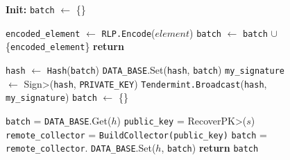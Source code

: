 \begin{figure}[t!]
  \begin{adjustbox}{minipage=[t]{\columnwidth}}
    \begin{algorithm}[H]
      \renewcommand{\thealgorithm}{Hash Collector}         
      \caption{}%
      \label{alg:collector-hash}%
      \small
      \begin{algorithmic}[1]
            \State \textbf{Init:} \texttt{batch} $\leftarrow$ \{\}
      
            \label{alg:hash_add_tx}
            			\State \texttt{encoded\_element} $\leftarrow$ \texttt{RLP.Encode}($element$)
					        \State \texttt{batch} $\leftarrow$ \texttt{batch} $\cup$ \{\texttt{encoded\_element}\}
                \EndIf
                \State \textbf{return}
            \EndFunction

            \smallskip

              \State \texttt{hash} $\leftarrow$  \texttt{Hash}(\texttt{batch})
              \State \texttt{DATA\_BASE}.Set(\texttt{hash}, \texttt{batch})
              \State \texttt{my\_signature} $\leftarrow$ \<Sign>(\texttt{hash}, \texttt{PRIVATE\_KEY})
              \State \texttt{Tendermint.Broadcast}(\texttt{hash}, \texttt{my\_signature})
              \State \texttt{batch} $\leftarrow$ \{\}
            \EndWhen

            \label{alg:hash_request_tx}
                \State \texttt{batch} = \texttt{DATA\_BASE}.Get($h$)
              \Else
                \State \texttt{public\_key} = \<RecoverPK>($s$)
                \State \texttt{remote\_collector} = \texttt{BuildCollector(public\_key)}
                \State \texttt{batch} = \texttt{remote\_collector}.
                  \State \texttt{DATA\_BASE}.Set($h$, \texttt{batch})
                \EndIf   
              \EndIf
              \State \textbf{return} \texttt{batch}
            \EndFunction
            
        \end{algorithmic}
      \end{algorithm}
	\end{adjustbox}
  \end{figure}
